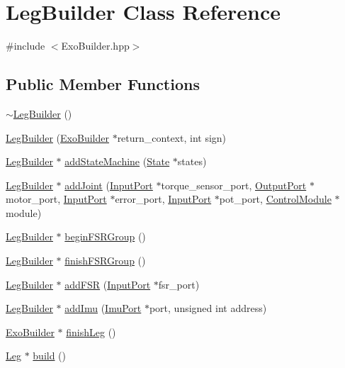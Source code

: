 \hypertarget{classLegBuilder}{}\section{Leg\+Builder Class Reference}
\label{classLegBuilder}


{\ttfamily \#include $<$Exo\+Builder.\+hpp$>$}

\subsection*{Public Member Functions}
\begin{DoxyCompactItemize}
\item 
\hyperlink{classLegBuilder_a388a349236abdbe1c8bc207d906165f7}{$\sim$\+Leg\+Builder} ()
\item 
\hyperlink{classLegBuilder_a40463e0ad0641a870c68683f31d36622}{Leg\+Builder} (\hyperlink{classExoBuilder}{Exo\+Builder} $\ast$return\+\_\+context, int sign)
\item 
\hyperlink{classLegBuilder}{Leg\+Builder} $\ast$ \hyperlink{classLegBuilder_a69ed97c456b0b5580477751cab2cdfec}{add\+State\+Machine} (\hyperlink{classState}{State} $\ast$states)
\item 
\hyperlink{classLegBuilder}{Leg\+Builder} $\ast$ \hyperlink{classLegBuilder_abc051ab2eadd43da9cc5ad0381b4d9c9}{add\+Joint} (\hyperlink{classInputPort}{Input\+Port} $\ast$torque\+\_\+sensor\+\_\+port, \hyperlink{classOutputPort}{Output\+Port} $\ast$motor\+\_\+port, \hyperlink{classInputPort}{Input\+Port} $\ast$error\+\_\+port, \hyperlink{classInputPort}{Input\+Port} $\ast$pot\+\_\+port, \hyperlink{classControlModule}{Control\+Module} $\ast$module)
\item 
\hyperlink{classLegBuilder}{Leg\+Builder} $\ast$ \hyperlink{classLegBuilder_a10e2bc65709a416d8f3af63789b8c6a8}{begin\+F\+S\+R\+Group} ()
\item 
\hyperlink{classLegBuilder}{Leg\+Builder} $\ast$ \hyperlink{classLegBuilder_a1108a50a12106f97063c966453a6e2d8}{finish\+F\+S\+R\+Group} ()
\item 
\hyperlink{classLegBuilder}{Leg\+Builder} $\ast$ \hyperlink{classLegBuilder_a9dac1f22f6498081a429445f379bd35e}{add\+F\+SR} (\hyperlink{classInputPort}{Input\+Port} $\ast$fsr\+\_\+port)
\item 
\hyperlink{classLegBuilder}{Leg\+Builder} $\ast$ \hyperlink{classLegBuilder_a92819625c46896bfb2ec09f382b11fc0}{add\+Imu} (\hyperlink{classImuPort}{Imu\+Port} $\ast$port, unsigned int address)
\item 
\hyperlink{classExoBuilder}{Exo\+Builder} $\ast$ \hyperlink{classLegBuilder_ac01adfec217033fbfb20286bfe33fe38}{finish\+Leg} ()
\item 
\hyperlink{classLeg}{Leg} $\ast$ \hyperlink{classLegBuilder_a6361be156ebc794ff1d2a9f7b640cb89}{build} ()
\end{DoxyCompactItemize}


